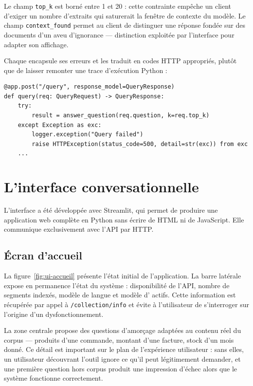 Le champ \texttt{top\_k} est borné entre 1 et 20 : cette contrainte empêche un
client d'exiger un nombre d'extraits qui saturerait la fenêtre de contexte du
modèle. Le champ \texttt{context\_found} permet au client de distinguer une
réponse fondée sur des documents d'un aveu d'ignorance --- distinction exploitée
par l'interface pour adapter son affichage.

Chaque  encapsule ses erreurs et les traduit en codes HTTP
appropriés, plutôt que de laisser remonter une trace d'exécution Python :

\begin{lstlisting}[style=python,caption={Traitement des erreurs}]
@app.post("/query", response_model=QueryResponse)
def query(req: QueryRequest) -> QueryResponse:
    try:
        result = answer_question(req.question, k=req.top_k)
    except Exception as exc:
        logger.exception("Query failed")
        raise HTTPException(status_code=500, detail=str(exc)) from exc
    ...
\end{lstlisting}

\section{L'interface conversationnelle}

L'interface a été développée avec Streamlit, qui permet de produire une
application web complète en Python sans écrire de HTML ni de JavaScript. Elle
communique exclusivement avec l'API par HTTP.

\subsection{Écran d'accueil}

La figure~\ref{fig:ui-accueil} présente l'état initial de l'application. La barre
latérale expose en permanence l'état du système : disponibilité de l'API, nombre
de segments indexés, modèle de langue et modèle d' actifs. Cette
information est récupérée par appel à \texttt{/collection/info} et évite à
l'utilisateur de s'interroger sur l'origine d'un dysfonctionnement.

La zone centrale propose des questions d'amorçage adaptées au contenu réel du
corpus --- produits d'une commande, montant d'une facture, stock d'un mois
donné. Ce détail est important sur le plan de l'expérience utilisateur : sans
elles, un utilisateur découvrant l'outil ignore ce qu'il peut légitimement
demander, et une première question hors corpus produit une impression d'échec
alors que le système fonctionne correctement.

